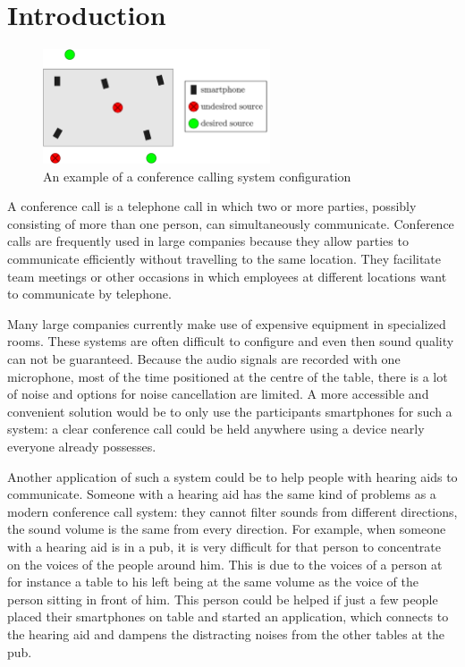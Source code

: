 \chapter{Introduction}
\label{introduction}

\begin{figure}[b!]
    \centering
		\includegraphics[width=0.6\textwidth]{afbeeldingen/goal_example.png}
	    \caption[Example conference calling system configuration]{An example of a conference calling system configuration}
	    \label{fig:goal}
\end{figure}

A conference call is a telephone call in which two or more parties, possibly consisting of more than one person, can simultaneously communicate.
Conference calls are frequently used in large companies because they allow parties to communicate efficiently without travelling to the same location.
They facilitate team meetings or other occasions in which employees at different locations want to communicate by telephone.

Many large companies currently make use of expensive equipment in specialized rooms.
These systems are often difficult to configure and even then sound quality can not be guaranteed.
Because the audio signals are recorded with one microphone, most of the time positioned at the centre of the table, there is a lot of noise and options for noise cancellation are limited.
A more accessible and convenient solution would be to only use the participants smartphones for such a system: a clear conference call could be held anywhere using a device nearly everyone already possesses.

Another application of such a system could be to help people with hearing aids to communicate.
Someone with a hearing aid has the same kind of problems as a modern conference call system: they cannot filter sounds from different directions, the sound volume is the same from every direction.
For example, when someone with a hearing aid is in a pub, it is very difficult for that person to concentrate on the voices of the people around him.
This is due to the voices of a person at for instance a table to his left being at the same volume as the voice of the person sitting in front of him.
This person could be helped if just a few people placed their smartphones on table and started an application, which connects to the hearing aid and dampens the distracting noises from the other tables at the pub.

